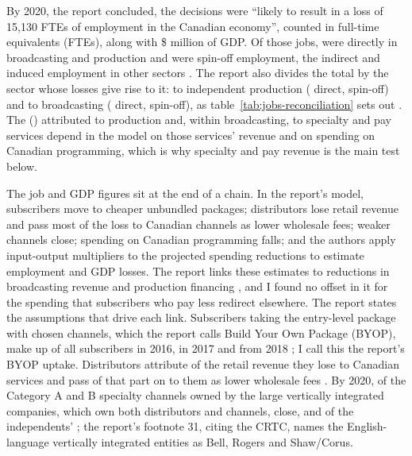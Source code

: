 By 2020, the report concluded, the decisions were \enquote{likely to result in a loss of 15,130 FTEs of employment in the Canadian economy}, counted in full-time equivalents (FTEs), along with \$\lttvGDPTotal{} million of GDP. Of those jobs, \lttvJobsDirect{} were directly in broadcasting and production and \lttvJobsSpinoff{} were spin-off employment, the indirect and induced employment in other sectors \citep[para.~xliv and Table~1 with its note, p.~12]{nordicity2015television}. The report also divides the total by the sector whose losses give rise to it: \lttvFTEProd{} to independent production (\lttvFTEProdDirect{} direct, \lttvFTEProdSpin{} spin-off) and \lttvFTEBroadcast{} to broadcasting (\lttvFTEBroadcastDirect{} direct, \lttvFTEBroadcastSpin{} spin-off), as table~\ref{tab:jobs-reconciliation} sets out \citep[paras.~246, 248, 250; Tables~22--23, pp.~90--92]{nordicity2015television}. The \lttvFTESpecProd{} (\lttvFTESpecProdShare{}) attributed to production and, within broadcasting, to specialty and pay services depend in the model on those services' revenue and on spending on Canadian programming, which is why specialty and pay revenue is the main test below.

The job and GDP figures sit at the end of a chain. In the report's model, subscribers move to cheaper unbundled packages; distributors lose retail revenue and pass most of the loss to Canadian channels as lower wholesale fees; weaker channels close; spending on Canadian programming falls; and the authors apply input-output multipliers to the projected spending reductions to estimate employment and GDP losses. The report links these estimates to reductions in broadcasting revenue and production financing \citep[para.~245]{nordicity2015television}, and I found no offset in it for the spending that subscribers who pay less redirect elsewhere. The report states the assumptions that drive each link. Subscribers taking the entry-level package with chosen channels, which the report calls Build Your Own Package (BYOP), make up \lttvByopSixteen{} of all subscribers in 2016, \lttvByopSeventeen{} in 2017 and \lttvByopEighteen{} from 2018 \citep[para.~202, Table~18, p.~76]{nordicity2015television}; I call this the report's BYOP uptake. Distributors attribute \lttvReportCanShare{} of the retail revenue they lose to Canadian services and pass \lttvReportPassThrough{} of that part on to them as lower wholesale fees \citep[paras.~206--207, p.~77]{nordicity2015television}. By 2020, \lttvReportClosuresVI{} of the Category A and B specialty channels owned by the large vertically integrated companies, which own both distributors and channels, close, and \lttvReportClosuresIndep{} of the independents' \citep[paras.~232--233, p.~85]{nordicity2015television}; the report's footnote 31, citing the CRTC, names the English-language vertically integrated entities as Bell, Rogers and Shaw/Corus.

